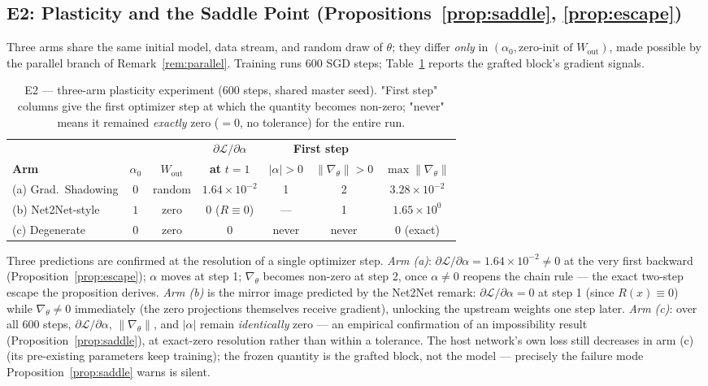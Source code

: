 \documentclass[11pt,a4paper]{article}
\newcommand{\Loss}{\mathcal{L}}
\begin{document}
\subsection{E2: Plasticity and the Saddle Point (Propositions~\ref{prop:saddle}, \ref{prop:escape})}

Three arms share the same initial model, data stream, and random draw of $\theta$; they differ \emph{only} in $(\alpha_0, \text{zero-init of } W_{\mathrm{out}})$, made possible by the parallel branch of Remark~\ref{rem:parallel}. Training runs 600 SGD steps; Table~\ref{tab:e2} reports the grafted block's gradient signals.

\begin{table}[htbp]
\centering
\caption{E2 --- three-arm plasticity experiment (600 steps, shared master seed). "First step" columns give the first optimizer step at which the quantity becomes non-zero; "never" means it remained \emph{exactly} zero ($= 0$, no tolerance) for the entire run.}
\label{tab:e2}
\small
\setlength{\tabcolsep}{4pt}
\begin{tabular}{l c c c c c c}
\toprule
 & & & $\partial\Loss/\partial\alpha$ & \multicolumn{2}{c}{\textbf{First step}} & \\
\cmidrule(lr){5-6}
\textbf{Arm} & $\alpha_0$ & $W_{\mathrm{out}}$ & \textbf{at} $t{=}1$ & $|\alpha| > 0$ & $\|\nabla_\theta\| > 0$ & $\max\|\nabla_\theta\|$ \\
\midrule
(a) Grad.\ Shadowing & $0$ & random & $1.64 \times 10^{-2}$ & 1 & 2 & $3.28 \times 10^{-2}$ \\
(b) Net2Net-style    & $1$ & zero   & $0$ ($R \equiv 0$)     & --- & 1 & $1.65 \times 10^{0}$ \\
(c) Degenerate       & $0$ & zero   & $0$                    & never & never & $0$ (exact) \\
\bottomrule
\end{tabular}
\end{table}

Three predictions are confirmed at the resolution of a single optimizer step. \emph{Arm (a)}: $\partial\Loss/\partial\alpha = 1.64\times 10^{-2} \neq 0$ at the very first backward (Proposition~\ref{prop:escape}); $\alpha$ moves at step 1; $\nabla_\theta$ becomes non-zero at step 2, once $\alpha \neq 0$ reopens the chain rule --- the exact two-step escape the proposition derives. \emph{Arm (b)} is the mirror image predicted by the Net2Net remark: $\partial\Loss/\partial\alpha = 0$ at step 1 (since $R(x) \equiv 0$) while $\nabla_\theta \neq 0$ immediately (the zero projections themselves receive gradient), unlocking the upstream weights one step later. \emph{Arm (c)}: over all 600 steps, $\partial\Loss/\partial\alpha$, $\|\nabla_\theta\|$, and $|\alpha|$ remain \emph{identically} zero --- an empirical confirmation of an impossibility result (Proposition~\ref{prop:saddle}), at exact-zero resolution rather than within a tolerance. The host network's own loss still decreases in arm (c) (its pre-existing parameters keep training); the frozen quantity is the grafted block, not the model --- precisely the failure mode Proposition~\ref{prop:saddle} warns is silent.
\end{document}
